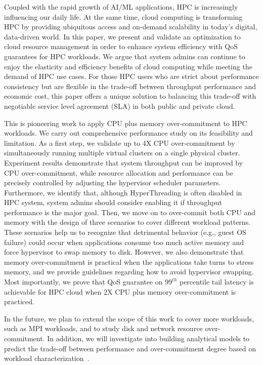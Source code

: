 Coupled with the rapid growth of AI/ML applications, HPC is increasingly influencing our daily life. 
At the same time, cloud computing is transforming
HPC by providing ubiquitous access and on-demand scalability in today's digital, data-driven world. 
In this paper, 
we present and validate an optimization to cloud resource management in order to enhance system efficiency with QoS guarantees for HPC workloads. We argue that system admins can
continue to enjoy the elasticity and efficiency benefits of cloud computing while meeting the demand of HPC 
use cases. For those HPC users who are strict about performance consistency but are flexible 
in the trade-off between throughput performance and economic cost, this paper offers a unique 
solution to balancing this trade-off with negotiable service level agreement (SLA) in both public and private cloud. 

This is pioneering work to apply CPU plus memory 
over-commitment to HPC workloads. We carry out comprehensive performance study on its feasibility and limitation. As a first step, we validate up to 4X CPU over-commitment by simultaneously running 
multiple virtual clusters on a single physical cluster. Experiment results demonstrate that system 
throughput can be improved by CPU over-commitment, while resource allocation and performance can be 
precisely controlled by adjusting the hypervisor scheduler parameters. Furthermore, we identify that, although HyperThreading is often disabled in HPC system, system admins should consider 
enabling it if throughput performance is the major goal. Then, we move on to over-commit 
both CPU and memory with the design of three scenarios to cover different workload patterns. These 
scenarios help us to recognize that detrimental behavior (e.g., guest OS failure) could occur when 
applications consume too much active memory and force hypervisor to swap memory to disk. However, 
we also demonstrate that memory over-commitment is practical when the applications take turns to 
stress memory, and we provide guidelines regarding how to avoid hypervisor swapping. Most importantly, 
we prove that QoS guarantee on $99^{th}$ percentile tail latency is achievable for HPC cloud 
when 2X CPU plus memory 
over-commitment is practiced. 

In the future, 
we plan to extend the scope of this work to cover more workloads, such as MPI workloads, and to study disk and network resource over-commitment. In addition, we will investigate into building 
analytical models to predict the trade-off between performance and over-commitment degree based on 
workload characterization~\cite{arlitt1997internet,234855}. 
